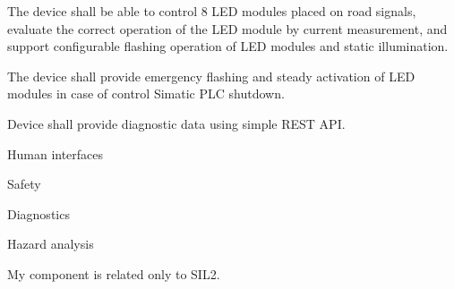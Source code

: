 The device shall be able to control 8 LED modules placed on road signals, evaluate the correct operation of the LED module by current measurement, and support configurable flashing operation of LED modules and static illumination.

The device shall provide emergency flashing and steady activation of LED modules in case of control Simatic PLC shutdown.

Device shall provide diagnostic data using simple REST API.

\secc Human interfaces

\secc Safety

\secc Diagnostics

\sec Hazard analysis


My component is related only to SIL2.